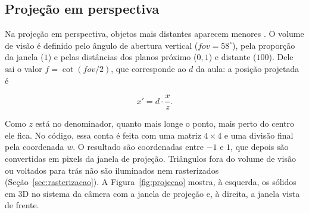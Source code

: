 \subsection{Projeção em perspectiva}\label{sec:projecao}

Na projeção em perspectiva, objetos mais distantes aparecem menores \cite{azevedo2018}. O volume de
visão é definido pelo ângulo de abertura vertical ($fov = 58^\circ$), pela proporção da janela
($1$) e pelas distâncias dos planos próximo ($0{,}1$) e distante ($100$). Dele sai o valor
$f = \cot(fov/2)$, que corresponde ao $d$ da aula: a posição projetada é

\begin{equation}
  x' = d \cdot \frac{x}{z} .
\end{equation}

Como $z$ está no denominador, quanto mais longe o ponto, mais perto do centro ele fica. No código,
essa conta é feita com uma matriz $4 \times 4$ e uma divisão final pela coordenada $w$. O resultado
são coordenadas entre $-1$ e $1$, que depois são convertidas em pixels da janela de projeção.
Triângulos fora do volume de visão ou voltados para trás não são iluminados nem rasterizados
(Seção~\ref{sec:rasterizacao}). A Figura~\ref{fig:projecao} mostra, à esquerda, os sólidos em 3D
no sistema da câmera com a janela de projeção e, à direita, a janela vista de frente.

